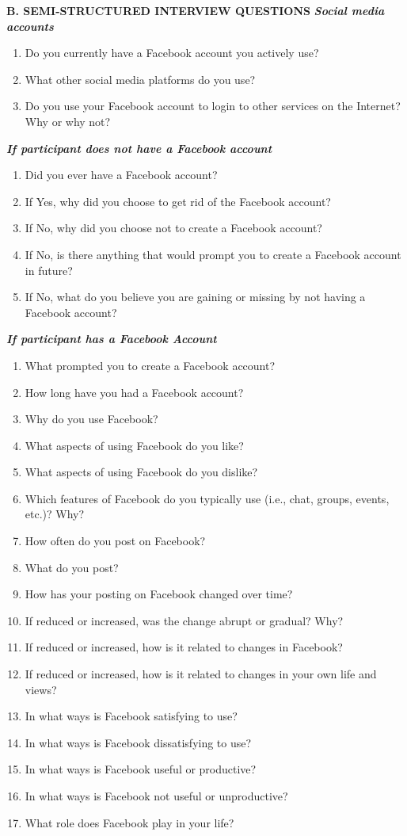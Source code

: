 \textbf{B. SEMI-STRUCTURED INTERVIEW QUESTIONS}
\textbf{\textit{Social media accounts}}
\begin{enumerate}
\item Do you currently have a Facebook account you actively use?
\item What other social media platforms do you use?
\item Do you use your Facebook account to login to other services on the Internet? Why or why not?
\end{enumerate}
\textbf{\textit{If participant does not have a Facebook account}}
\begin{enumerate}
\item Did you ever have a Facebook account?
\item If Yes, why did you choose to get rid of the Facebook account?
\item If No, why did you choose not to create a Facebook account?
\item If No, is there anything that would prompt you to create a Facebook account in future?
\item If No, what do you believe you are gaining or missing by not having a Facebook account?
\end{enumerate}
\textbf{\textit{If participant has a Facebook Account}}
\begin{enumerate}
\item What prompted you to create a Facebook account?
\item How long have you had a Facebook account?
\item Why do you use Facebook?
\item What aspects of using Facebook do you like?
\item What aspects of using Facebook do you dislike?
\item Which features of Facebook do you typically use (i.e., chat, groups, events, etc.)? Why?
\item How often do you post on Facebook?
\item What do you post?
\item How has your posting on Facebook changed over time?
\item If reduced or increased, was the change abrupt or gradual? Why?
\item If reduced or increased, how is it related to changes in Facebook?
\item If reduced or increased, how is it related to changes in your own life and views?
\item In what ways is Facebook satisfying to use?
\item In what ways is Facebook dissatisfying to use?
\item In what ways is Facebook useful or productive?
\item In what ways is Facebook not useful or unproductive?
\item What role does Facebook play in your life?
\end{enumerate}
